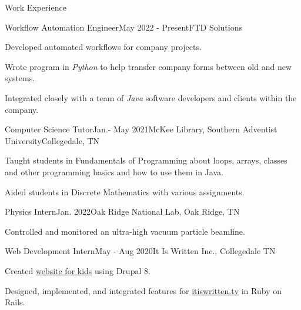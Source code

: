 \begin{rSection}{Work Experience}
	\begin{job}{Workflow Automation Engineer}{May 2022 - Present}{FTD Solutions}{}
		\item Developed automated workflows for company projects.
		\item Wrote program in {\em Python} to help transfer company forms between old and new systems.
		\item Integrated closely with a team of {\em Java} software developers and clients within the company.
	\end{job}
	
	\begin{job}{Computer Science Tutor}{Jan.- May 2021}{McKee Library, Southern Adventist University}{Collegedale, TN}
	 \item Taught students in Fundamentals of Programming about loops, arrays, classes and other programming basics and how to use them in Java.
	 \item Aided students in Discrete Mathematics with various assignments.
	\end{job}

	\begin{job}{Physics Intern}{Jan. 2022}{Oak Ridge National Lab, Oak Ridge, TN}{}
	 \item Controlled and monitored an ultra-high vacuum particle beamline.
	\end{job}

	\begin{job}{Web Development Intern}{May - Aug 2020}{It Is Written Inc., Collegedale TN}{}
		\item Created \href{https://buriedtreasure.fun/}{website for kids} using Drupal 8.
		\item Designed, implemented, and integrated features for \href{https://itiswritten.tv}{itiswritten.tv} in Ruby on Rails.
	\end{job}
\end{rSection}